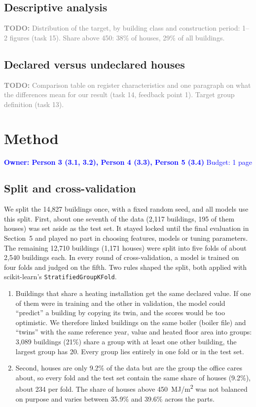 \documentclass[11pt,a4paper]{article}
\newcommand{\owner}[2]{\noindent\textcolor{blue}{\textbf{Owner: #1} \quad Budget: #2}\par\medskip}
\newcommand{\todo}[1]{\noindent\textcolor{gray}{\small\textbf{TODO:} #1}\par\medskip}
\begin{document}
\subsection{Descriptive analysis}
\todo{Distribution of the target, by building class and construction period: 1--2 figures (task 15).
Share above 450: 38\% of houses, 29\% of all buildings.}

\subsection{Declared versus undeclared houses}
\todo{Comparison table on register characteristics and one paragraph on what the differences mean for our result
(task 14, feedback point 1). Target group definition (task 13).}

\section{Method}
\owner{Person 3 (3.1, 3.2), Person 4 (3.3), Person 5 (3.4)}{1 page}

\subsection{Split and cross-validation}
We split the 14,827 buildings once, with a fixed random seed, and all models use this split.
First, about one seventh of the data (2,117 buildings, 195 of them houses) was set aside as the
test set. It stayed locked until the final evaluation in Section~5 and played no part in choosing
features, models or tuning parameters. The remaining 12,710 buildings (1,171 houses) were split
into five folds of about 2,540 buildings each. In every round of cross-validation, a model is
trained on four folds and judged on the fifth. Two rules shaped the split, both applied with scikit-learn's \texttt{StratifiedGroupKFold}.
\begin{enumerate}
    \item Buildings that share a heating installation get the same declared value. If one of them were
in training and the other in validation, the model could “predict” a building by copying its
twin, and the scores would be too optimistic. We therefore linked buildings on the same
boiler (boiler file) and “twins” with the same reference year, value and heated floor area
into groups: 3,089 buildings (21\%) share a group with at least one other building, the
largest group has 20. Every group lies entirely in one fold or in the test set.
    \item  Second, houses are only 9.2\% of the data
but are the group the office cares about, so every fold and the test set contain the same share of
houses (9.2\%), about 234 per fold. The share of houses above 450~MJ/m\textsuperscript{2} was not
balanced on purpose and varies between 35.9\% and 39.6\% across the parts.
\end{enumerate}
\end{document}
